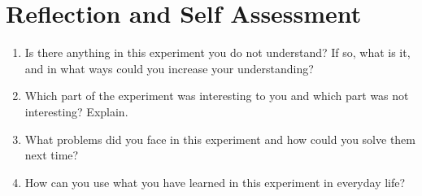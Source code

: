 \section{Reflection and Self Assessment}
\begin{enumerate}
\item Is there anything in this experiment you do not understand? If so, what is it, and in what ways could you increase your understanding?
\item Which part of the experiment was interesting to you and which part was not interesting? Explain.
\item What problems did you face in this experiment and how could you solve them next time?
\item How can you use what you have learned in this experiment in everyday life?

\end{enumerate}